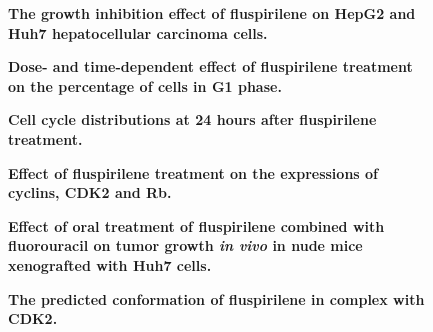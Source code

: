 \documentclass[10pt]{article}
\begin{document}
\begin{figure}[!ht]
\begin{center}
\end{center}
\caption{
{\bf The growth inhibition effect of fluspirilene on HepG2 and Huh7 hepatocellular carcinoma cells.}
}
\label{CellViabilityAgainstTime}
\end{figure}

\begin{figure}[!ht]
\begin{center}
\end{center}
\caption{
{\bf Dose- and time-dependent effect of fluspirilene treatment on the percentage of cells in G1 phase.}
}
\label{G1Distribution}
\end{figure}

\begin{figure}[!ht]
\begin{center}
\end{center}
\caption{
{\bf Cell cycle distributions at 24 hours after fluspirilene treatment.}
}
\label{CellCycleDistribution}
\end{figure}

\begin{figure}[!ht]
\begin{center}
\end{center}
\caption{
{\bf Effect of fluspirilene treatment on the expressions of cyclins, CDK2 and Rb.}
}
\label{WesternBlot}
\end{figure}

\begin{figure}[!ht]
\begin{center}
\end{center}
\caption{
{\bf Effect of oral treatment of fluspirilene combined with fluorouracil on tumor growth \textit{in vivo} in nude mice xenografted with Huh7 cells.}
}
\label{FluspirileneFluorouracilOnTumorGrowth}
\end{figure}

\begin{figure}[!ht]
\begin{center}
\end{center}
\caption{
{\bf The predicted conformation of fluspirilene in complex with CDK2.}
}
\label{1GZ8-ZINC00537755-ms}
\end{figure}
\end{document}
